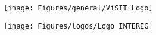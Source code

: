 \documentclass[
10pt, %
a4paper, %
oneside, %
headinclude,footinclude, %
BCOR5mm, %
]{scrartcl}
\title{\normalfont\spacedallcaps{ViSIT - Technische Dokumentation}} %
\author{Tobias Baumg\"artner\textsuperscript{1} \& Emanuel Berndl\textsuperscript{2} \& \\ Robert Kathrein\textsuperscript{3} \& Kris Raich\textsuperscript{3} \& \\ Florian Schlenker\textsuperscript{4}} %
\date{\today} %
\begin{document}

\renewcommand{\sectionmark}[1]{\markright{\spacedlowsmallcaps{#1}}} %
\lehead{\mbox{\llap{\small\thepage\kern1em\color{halfgray} \vline}\color{halfgray}\hspace{0.5em}\rightmark\hfil}} %

\pagestyle{scrheadings} %


\maketitle %

\setcounter{tocdepth}{2} %

\begin{figure}[htb]
    \centering
    \texttt{[image: Figures/general/ViSIT\_Logo]}
\end{figure}

\begin{figure}[htb]
    \centering
    \texttt{[image: Figures/logos/Logo\_INTEREG]}
\end{figure}

\newpage

\tableofcontents %

\listoffigures %

\listoftables %


\end{document}
